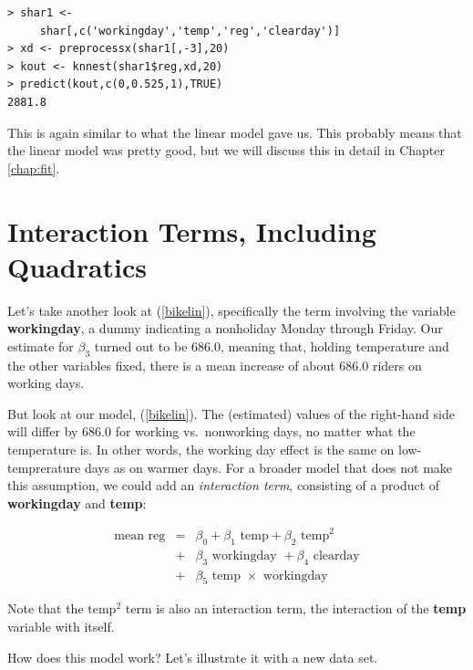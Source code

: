 \begin{lstlisting}
> shar1 <- 
     shar[,c('workingday','temp','reg','clearday')]
> xd <- preprocessx(shar1[,-3],20)
> kout <- knnest(shar1$reg,xd,20)
> predict(kout,c(0,0.525,1),TRUE)
2881.8 
\end{lstlisting} 

This is again similar to what the linear model gave us.  This probably
means that the linear model was pretty good, but we will discuss this in
detail in Chapter \ref{chap:fit}.

\section{Interaction Terms, Including Quadratics}
\label{interaction}

Let's take another look at (\ref{bikelin}), specifically the term
involving the variable {\bf workingday}, a dummy indicating a nonholiday
Monday through Friday.  Our estimate for $\beta_3$ turned out to be
686.0, meaning that, holding temperature and the other variables fixed,
there is a mean increase of about  686.0 riders on working days.

But look at our model, (\ref{bikelin}).  The (estimated) values of the
right-hand side will differ by 686.0 for working vs.\ nonworking days,
no matter what the temperature is.  In other words, the working day
effect is the same on low-temprerature days as on warmer days.  For a
broader model that does not make this assumption, we could add an {\it
interaction term}, consisting of a product of {\bf workingday} and {\bf
temp}:

\begin{eqnarray}
\textrm{mean reg} 
&=& 
\beta_0 + 
\beta_1 \textrm{ temp} + 
\beta_2 \textrm{ temp}^2 \nonumber \\
&+& 
\beta_3 \textrm{ workingday } +
\beta_4 \textrm{ clearday} \\
&+& 
\beta_5 \textrm{ temp } \times \textrm{ workingday}
\end{eqnarray}

Note that the $\textrm{temp}^2$ term is also an interaction term, the
interaction of the {\bf temp} variable with itself.

How does this model work?  Let's illustrate it with a new data set.

